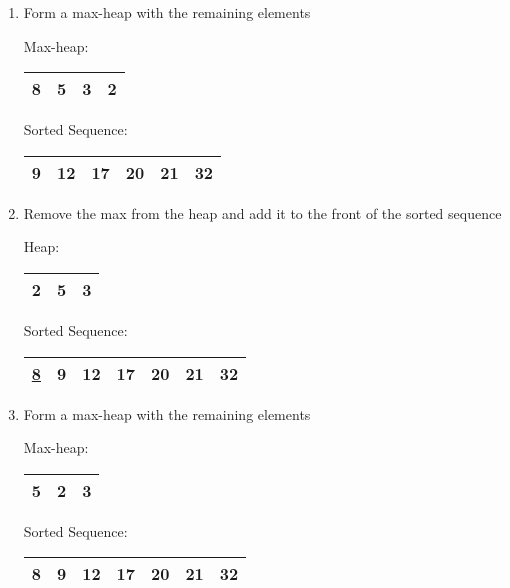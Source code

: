 \documentclass[fleqn, 12pt]{article}
\begin{document}
\begin{enumerate}[Step 1:]
\item Form a max-heap with the remaining elements
    \begin{center}
        Max-heap:
        \begin{tabular}{|*{4}{c|}}
            \hline
            8 & 5 & 3 & 2\\
            \hline
        \end{tabular}
    \end{center}
    \begin{center}
        Sorted Sequence:
        \begin{tabular}{|*{6}{c|}}
            \hline
            9 & 12 & 17 & 20 & 21 & 32\\
            \hline
        \end{tabular}
    \end{center}
    
\item Remove the max from the heap and add it to the front of the sorted sequence
    \begin{center}
        Heap:
        \begin{tabular}{|*{3}{c|}}
            \hline
            2 & 5 & 3\\
            \hline
        \end{tabular}
    \end{center}
    \begin{center}
        Sorted Sequence:
        \begin{tabular}{|*{7}{c|}}
            \hline
            \underline{8} & 9 & 12 & 17 & 20 & 21 & 32\\
            \hline
        \end{tabular}
    \end{center}
    
\item Form a max-heap with the remaining elements
    \begin{center}
        Max-heap:
        \begin{tabular}{|*{3}{c|}}
            \hline
            5 & 2 & 3\\
            \hline
        \end{tabular}
    \end{center}
    \begin{center}
        Sorted Sequence:
        \begin{tabular}{|*{7}{c|}}
            \hline
            8 & 9 & 12 & 17 & 20 & 21 & 32\\
            \hline
        \end{tabular}
    \end{center}
    \newpage
    

\end{enumerate}
\end{document}
